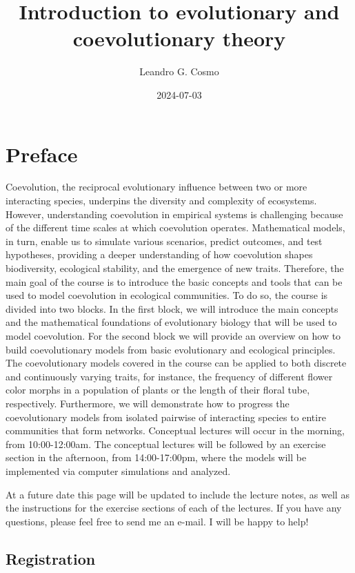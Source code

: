 \documentclass[
]{book}
\title{Introduction to evolutionary and coevolutionary theory}
\author{Leandro G. Cosmo}
\date{2024-07-03}
\begin{document}
\maketitle

{
\setcounter{tocdepth}{1}
\tableofcontents
}
\hypertarget{preface}{%
\chapter{Preface}\label{preface}}

Coevolution, the reciprocal evolutionary influence between two or more interacting species, underpins the diversity and complexity of ecosystems. However, understanding coevolution in empirical systems is challenging because of the different time scales at which coevolution operates. Mathematical models, in turn, enable us to simulate various scenarios, predict outcomes, and test hypotheses, providing a deeper understanding of how coevolution shapes biodiversity, ecological stability, and the emergence of new traits. Therefore, the main goal of the course is to introduce the basic concepts and tools that can be used to model coevolution in ecological communities. To do so, the course is divided into two blocks. In the first block, we will introduce the main concepts and the mathematical foundations of evolutionary biology that will be used to model coevolution. For the second block we will provide an overview on how to build coevolutionary models from basic evolutionary and ecological principles. The coevolutionary models covered in the course can be applied to both discrete and continuously varying traits, for instance, the frequency of different flower color morphs in a population of plants or the length of their floral tube, respectively. Furthermore, we will demonstrate how to progress the coevolutionary models from isolated pairwise of interacting species to entire communities that form networks. Conceptual lectures will occur in the morning, from 10:00-12:00am. The conceptual lectures will be followed by an exercise section in the afternoon, from 14:00-17:00pm, where the models will be implemented via computer simulations and analyzed.

At a future date this page will be updated to include the lecture notes, as well as the instructions for the exercise sections of each of the lectures. If you have any questions, please feel free to send me an e-mail. I will be happy to help!

\hypertarget{registration}{%
\section{Registration}\label{registration}}
\end{document}
